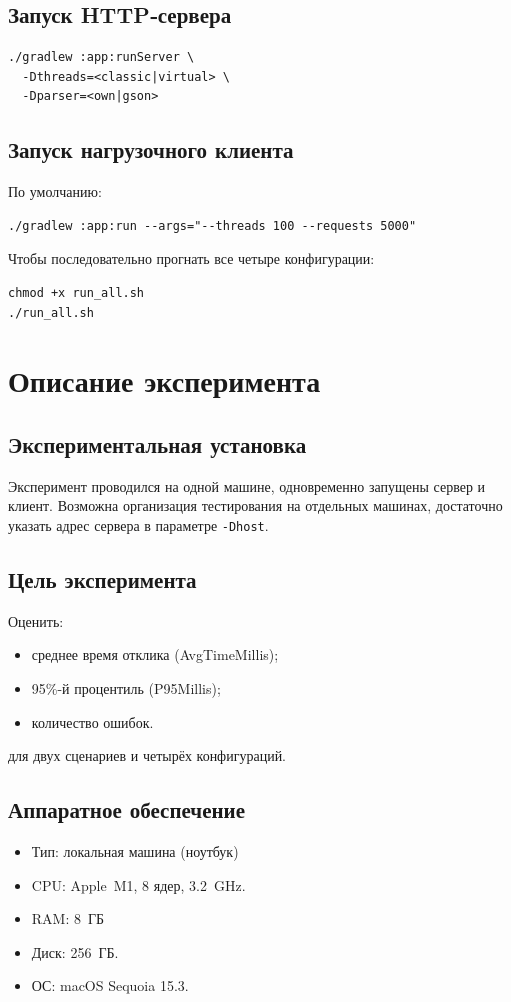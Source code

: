 \documentclass[areasetadvanced]{scrartcl}
\begin{document}
\subsection{Запуск HTTP‑сервера}
\begin{lstlisting}
./gradlew :app:runServer \
  -Dthreads=<classic|virtual> \
  -Dparser=<own|gson>
\end{lstlisting}

\subsection{Запуск нагрузочного клиента}
По умолчанию:
\begin{lstlisting}
./gradlew :app:run --args="--threads 100 --requests 5000"
\end{lstlisting}
Чтобы последовательно прогнать все четыре конфигурации:
\begin{lstlisting}
chmod +x run_all.sh
./run_all.sh
\end{lstlisting}

\newpage
\section{Описание эксперимента}
\subsection{Экспериментальная установка}
Эксперимент проводился на одной машине, одновременно запущены сервер и клиент. Возможна организация тестирования на отдельных машинах, достаточно указать адрес сервера в параметре \texttt{-Dhost}.

\subsection{Цель эксперимента}
Оценить:
\begin{itemize}
  \item среднее время отклика (AvgTimeMillis);
  \item 95\%-й процентиль (P95Millis);
  \item количество ошибок.
\end{itemize}
для двух сценариев и четырёх конфигураций.

\subsection{Аппаратное обеспечение}
\begin{itemize}
  \item Тип: локальная машина (ноутбук)
  \item CPU: Apple M1, 8 ядер, 3.2 GHz.
  \item RAM: 8 ГБ
  \item Диск: 256 ГБ.
  \item ОС: macOS Sequoia 15.3.
\end{itemize}
\end{document}
